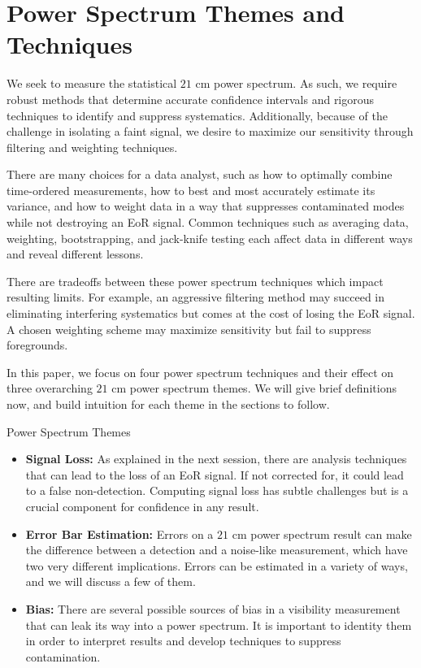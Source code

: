 \documentclass[preprint2,numberedappendix,tighten,twocolappendix]{aastex6}  %
\begin{document}
\section{Power Spectrum Themes and Techniques}
\label{sec:Themes}

We seek to measure the statistical $21$ cm power spectrum. As such, we require robust methods that determine accurate confidence intervals and rigorous techniques to identify and suppress systematics. Additionally, because of the challenge in isolating a faint signal, we desire to maximize our sensitivity through filtering and weighting techniques.

There are many choices for a data analyst, such as how to optimally combine time-ordered measurements, how to best and most accurately estimate its variance, and how to weight data in a way that suppresses contaminated modes while not destroying an EoR signal. Common techniques such as averaging data, weighting, bootstrapping, and jack-knife testing each affect data in different ways and reveal different lessons.

There are tradeoffs between these power spectrum techniques which impact resulting limits. For example, an aggressive filtering method may succeed in eliminating interfering systematics but comes at the cost of losing the EoR signal. A chosen weighting scheme may maximize sensitivity but fail to suppress foregrounds.

In this paper, we focus on four power spectrum techniques and their effect on three overarching $21$ cm power spectrum themes. We will give brief definitions now, and build intuition for each theme in the sections to follow.

\begin{center}
Power Spectrum Themes
\end{center}
\begin{itemize}
\item \textbf{Signal Loss:} As explained in the next session, there are analysis techniques that can lead to the loss of an EoR signal. If not corrected for, it could lead to a false non-detection. Computing signal loss has subtle challenges but is a crucial component for confidence in any result.
\item \textbf{Error Bar Estimation:} Errors on a $21$ cm power spectrum result can make the difference between a detection and a noise-like measurement, which have two very different implications. Errors can be estimated in a variety of ways, and we will discuss a few of them.
\item \textbf{Bias:} There are several possible sources of bias in a visibility measurement that can leak its way into a power spectrum. It is important to identity them in order to interpret results and develop techniques to suppress contamination.
\end{itemize}
\end{document}
